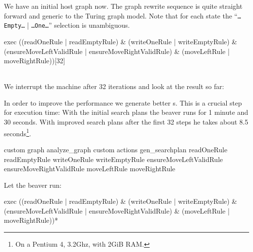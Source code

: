We have an initial host graph now. The graph rewrite sequence is quite straight forward and generic to the Turing graph model. Note that for each state the ``\texttt{\dots Empty\dots} | \texttt{\dots One\dots}'' selection is unambiguous.
\begin{grshell}[firstnumber=last]
  exec ((readOneRule | readEmptyRule) & (writeOneRule | writeEmptyRule) & (ensureMoveLeftValidRule | ensureMoveRightValidRule) & (moveLeftRule | moveRightRule))[32]

\end{grshell}
\quad\\We interrupt the machine after 32 iterations and look at the result so far:
\begin{center}
\end{center}
In order to improve the performance we generate better s. This is a crucial step for execution time: With the initial search plans the beaver runs for 1 minute and 30 seconds. With improved search plans after the first 32 steps he takes about 8.5 seconds\footnote{On a Pentium 4, 3.2Ghz, with 2GiB RAM.}.
\begin{grshell}[firstnumber=last]
custom graph analyze_graph
custom actions gen_searchplan readOneRule readEmptyRule writeOneRule writeEmptyRule ensureMoveLeftValidRule ensureMoveRightValidRule moveLeftRule moveRightRule

\end{grshell}

Let the beaver run:
\begin{grshell}[firstnumber=last]
  exec ((readOneRule | readEmptyRule) & (writeOneRule | writeEmptyRule) & (ensureMoveLeftValidRule | ensureMoveRightValidRule) & (moveLeftRule | moveRightRule))*
\end{grshell}


